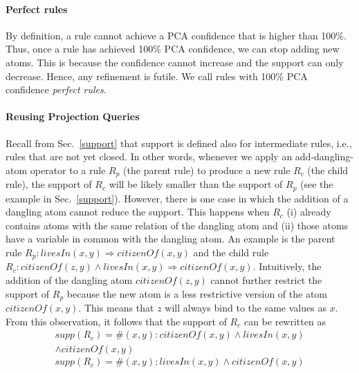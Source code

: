 \paragraph{Perfect rules}
By definition, a rule cannot achieve a PCA confidence that is higher than 100\%. 
Thus, once a rule has achieved 100\% PCA confidence, we can stop adding new atoms. 
This is because the confidence cannot increase and the support can only decrease. 
Hence, any refinement is futile. We call rules with 100\% PCA confidence \emph{perfect rules}.



\paragraph{Reusing Projection Queries}
Recall from Sec.~\ref{support} that support is defined also for intermediate rules, i.e., rules that are not yet closed. 
In other words, whenever we apply an add-dangling-atom operator to a rule $R_p$ (the parent rule) to produce
a new rule $R_c$ (the child rule), the support of $R_c$ will be likely smaller than the support of $R_p$ (see the example in Sec.~\ref{support}).
However, there is one case in which the addition of a dangling atom cannot reduce the support. 
This happens when $R_c$ 
(i) already contains atoms with the same relation of the dangling atom  and 
(ii) those atoms have a variable in common with the dangling atom.
An example is the parent rule $R_p:livesIn(x,y)\Rightarrow citizenOf(x,y)$ and the child rule 
$R_c: citizenOf(z,y)\wedge livesIn(x,y)\Rightarrow citizenOf(x,y)$.
Intuitively, the addition of the dangling atom $\textit{citizenOf}(z,y)$ cannot further restrict the support of $R_p$ because
the new atom is a less restrictive version of the atom $citizenOf(x,y)$.
This means that $z$ will always bind to the same values as $x$. 
From this observation, it follows that the support of $R_c$ can be rewritten as 
\begin{multline*}
supp(R_c) = \#(x,y):  citizenOf(x,y)\wedge livesIn(x,y) \\ \wedge citizenOf(x,y)
\end{multline*}
\[
 supp(R_c) = \#(x,y):   livesIn(x,y)\wedge citizenOf(x,y)
\]




